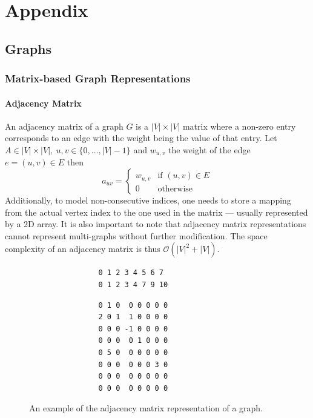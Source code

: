  \chapter{Appendix}
    \section{Graphs}
     \subsection{Matrix-based Graph Representations}\label{mbr}
        \subsubsection*{Adjacency Matrix}
            An adjacency matrix of a graph $G$ is a $|V|\times|V|$ matrix where a non-zero entry corresponds to an edge with the weight being the value of that entry. 
            Let $A \in |V|\times|V|, \ u, v \in \{0, \dots, |V| - 1\}$ and $w_{u,v}$ the weight of the edge $e = (u,v) \in E$ then
            \[ a_{uv} = \begin{cases}
                        w_{u,v} & \text{if } (u,v) \in E \\
                        0 & \text{otherwise}
                        \end{cases}
            \]
            Additionally, to model non-consecutive indices, one needs to store a mapping from the actual vertex index to the one used in the matrix --- usually represented by a 2D array. 
            It is also important to note that adjacency matrix representations cannot represent multi-graphs without further modification.
            The space complexity of an adjacency matrix is thus $\mathcal{O}(|V|^2 + |V|)$.
            \begin{figure}[htp]
            \begin{center}
            \begin{verbatim}
                0 1 2 3 4 5 6 7
                0 1 2 3 4 7 9 10
            \end{verbatim}
            \begin{verbatim}
                0 1 0  0 0 0 0 0
                2 0 1  1 0 0 0 0
                0 0 0 -1 0 0 0 0
                0 0 0  0 1 0 0 0
                0 5 0  0 0 0 0 0
                0 0 0  0 0 0 3 0
                0 0 0  0 0 0 0 0
                0 0 0  0 0 0 0 0
            \end{verbatim}
            \end{center}
            \caption{An example of the adjacency matrix representation of a graph.}
            \label{adm}
            \end{figure} 
